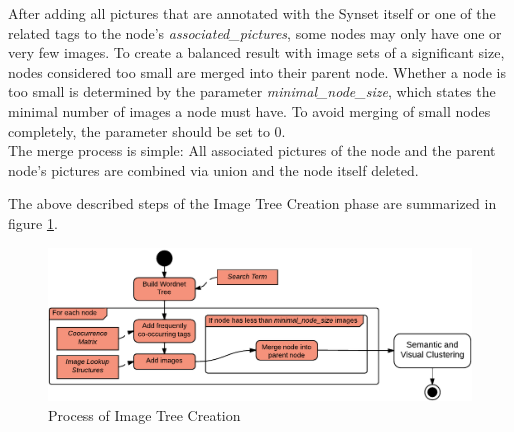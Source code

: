 After adding all pictures that are annotated with the Synset itself or one of the related tags to the node's \emph{associated\_pictures}, some nodes may only have one or very few images. To create a balanced result with image sets of a significant size, nodes considered too small are merged into their parent node. Whether a node is too small is determined by the parameter \emph{minimal\_node\_size}, which states the minimal number of images a node must have. To avoid merging of small nodes completely, the parameter should be set to 0.\\
The merge process is simple: All associated pictures of the node and the parent node's pictures are combined via union and the node itself deleted. 

\bigskip
The above described steps of the Image Tree Creation phase are summarized in figure \ref{fig_imagetreecreation}.

\begin{figure}[h]
\centering
\includegraphics[width=\textwidth]{images/image_tree_creation.pdf}
\caption{Process of Image Tree Creation}
\label{fig_imagetreecreation}
\end{figure}
